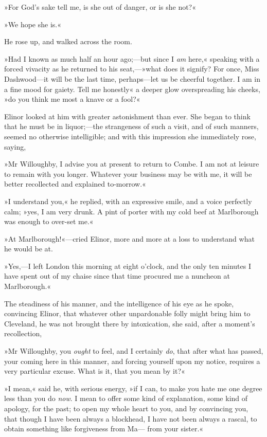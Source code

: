 »For God’s sake tell me, is she out of danger, or is she not?«

»We hope she is.«

He rose up, and walked across the room.

»Had I known as much half an hour ago;—but since I \textit{am} here,« speaking with a forced vivacity as he returned to his seat,—»what does it signify? For once, Miss Dashwood—it will be the last time, perhaps—let us be cheerful together. I am in a fine mood for gaiety. Tell me honestly« a deeper glow overspreading his cheeks, »do you think me most a knave or a fool?«

Elinor looked at him with greater astonishment than ever. She began to think that he must be in liquor;—the strangeness of such a visit, and of such manners, seemed no otherwise intelligible; and with this impression she immediately rose, saying,

»Mr Willoughby, I advise you at present to return to Combe. I am not at leisure to remain with you longer. Whatever your business may be with me, it will be better recollected and explained to-morrow.«

»I understand you,« he replied, with an expressive smile, and a voice perfectly calm; »yes, I am very drunk. A pint of porter with my cold beef at Marlborough was enough to over-set me.«

»At Marlborough!«—cried Elinor, more and more at a loss to understand what he would be at.

»Yes,—I left London this morning at eight o’clock, and the only ten minutes I have spent out of my chaise since that time procured me a nuncheon at Marlborough.«

The steadiness of his manner, and the intelligence of his eye as he spoke, convincing Elinor, that whatever other unpardonable folly might bring him to Cleveland, he was not brought there by intoxication, she said, after a moment’s recollection,

»Mr Willoughby, you \textit{ought} to feel, and I certainly \textit{do}, that after what has passed, your coming here in this manner, and forcing yourself upon my notice, requires a very particular excuse. What is it, that you mean by it?«

»I mean,« said he, with serious energy, »if I can, to make you hate me one degree less than you do \textit{now}. I mean to offer some kind of explanation, some kind of apology, for the past; to open my whole heart to you, and by convincing you, that though I have been always a blockhead, I have not been always a rascal, to obtain something like forgiveness from Ma— from your sister.«

